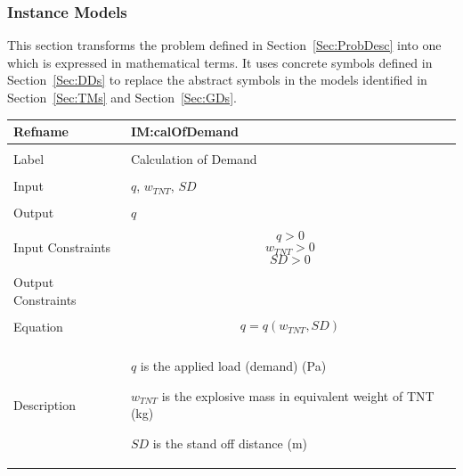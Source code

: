 \documentclass[12pt]{article}
\begin{document}
\subsubsection{Instance Models}
\label{Sec:IMs}
This section transforms the problem defined in Section~\ref{Sec:ProbDesc} into one which is expressed in mathematical terms. It uses concrete symbols defined in Section~\ref{Sec:DDs} to replace the abstract symbols in the models identified in Section~\ref{Sec:TMs} and Section~\ref{Sec:GDs}.
~\newline
\noindent \begin{minipage}{\textwidth}
\begin{tabular}{p{} p{}}
\toprule \textbf{Refname} & \textbf{IM:calOfDemand}
\label{IM:calOfDemand}
\\ \midrule \\
Label & Calculation of Demand
\\ \midrule \\
Input & $q$, ${w_{TNT}}$, $SD$
\\ \midrule \\
Output & $q$
\\ \midrule \\
Input Constraints & \begin{dmath}
                    q>0
                    \end{dmath}
                    \begin{dmath}
                    {w_{TNT}}>0
                    \end{dmath}
                    \begin{dmath}
                    SD>0
                    \end{dmath}
\\ \midrule \\
Output Constraints & 
\\ \midrule \\
Equation & \begin{dmath}
           q=q\left({w_{TNT}},SD\right)
           \end{dmath}
\\ \midrule \\
Description & \begin{symbDescription}
              \item{$q$ is the applied load (demand) (Pa)}
              \item{${w_{TNT}}$ is the explosive mass in equivalent weight of TNT (kg)}
              \item{$SD$ is the stand off distance (m)}

\end{symbDescription}
\end{tabular}
\end{minipage}
\end{document}
